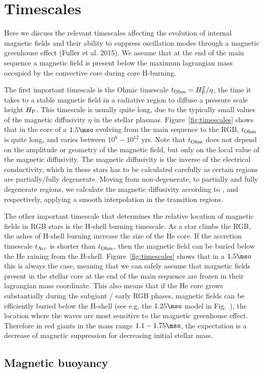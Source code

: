 \section{Timescales}
\label{time}
Here we discuss the relevant timescales affecting the evolution of internal magnetic fields and their ability to 
suppress oscillation modes through a magnetic greenhouse effect (Fuller et al. 2015).
We assume that at the end of the main sequence a magnetic field is present below the maximum lagrangian mass occupied by the convective core during core H-burning.

The first important timescale is the Ohmic timescale $t_{\rm Ohm}= H_{\rm P}^2/\eta$, the time it takes to a stable magnetic field in a radiative region to diffuse a pressure scale height $H_{\rm P}$. This timescale is usually quite long, due to the typically  small values of the magnetic diffusivity $\eta$ in the stellar plasmas. Figure~\ref{fig:timescales} shows that in the core of a $1.5\mso$ evolving from the main sequence to the RGB,  $t_{\rm Ohm}$ is quite long, and varies between $10^8-10^{12}$ yrs. Note that  $t_{\rm Ohm}$ does not depend on the amplitude or geometry of the magnetic field, but only on the local value of the magnetic diffusivity. The magnetic diffusivity is the inverse of the electrical conductivity,  which in these stars has to be calculated carefully as certain regions are partially/fully degenerate. Moving from non-degenerate, to partially and fully degenerate regions, we calculate the magnetic diffusivity according to ,  and  respectively, applying a smooth interpolation in the transition regions.

The other important timescale that determines the relative location of magnetic fields in  RGB stars is the H-shell burning timescale. As a star climbs the RGB, the ashes of H-shell burning increase the size of the He core. If the accretion timescale $t_{\rm Acc}$  is shorter than  $t_{\rm Ohm}$, then the magnetic field can be buried below the He raining from the H-shell. Figure~\ref{fig:timescales} shows that in a $1.5\mso$ this is always the case, meaning that 
we can safely assume that magnetic fields present in the stellar core at the end of the main sequence are frozen in their lagrangian mass coordinate. This also means that if the He core grows substantially during the subgiant / early RGB phases, magnetic fields can be efficiently buried below the H-shell (see e.g. the $1.25\mso$ model in Fig.~\label{fig:DipoleHist}), the location where the waves are most sensitive to the magnetic greenhouse effect. Therefore in red giants in the mass range $1.1-1.75\mso$, the expectation is a decrease of magnetic suppression for decreasing initial stellar mass.

\subsection{Magnetic buoyancy}